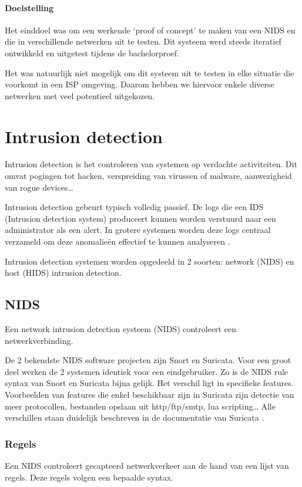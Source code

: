 \documentclass[a4paper, 12pt]{report}
\begin{document}
\subsubsection{Doelstelling}
Het einddoel was om een werkende `proof of concept' te maken van een NIDS en die in verschillende netwerken uit te testen.
Dit systeem werd steeds iteratief ontwikkeld en uitgetest tijdens de bachelorproef.

Het was natuurlijk niet mogelijk om dit systeem uit te testen in elke situatie die voorkomt in een ISP omgeving.
Daarom hebben we hiervoor enkele diverse netwerken met veel potentieel uitgekozen.

\chapter{Intrusion detection}
Intrusion detection is het controleren van systemen op verdachte activiteiten.
Dit omvat pogingen tot hacken, verspreiding van virussen of malware, aanwezigheid van rogue devices\dots

Intrusion detection gebeurt typisch volledig passief.
De logs die een IDS (Intrusion detection system) produceert kunnen worden verstuurd naar een administrator als een alert.
In grotere systemen worden deze logs centraal verzameld om deze anomalieën effectief te kunnen analyseren \autocite{wikipedia:ids}.

Intrusion detection systemen worden opgedeeld in 2 soorten: network (NIDS) en host (HIDS) intrusion detection.

\section{NIDS}
Een network intrusion detection systeem (NIDS) controleert een netwerkverbinding.

De 2 bekendste NIDS software projecten zijn Snort en Suricata.
Voor een groot deel werken de 2 systemen identiek voor een eindgebruiker.
Zo is de NIDS rule syntax van Snort en Suricata bijna gelijk.
Het verschil ligt in specifieke features.
Voorbeelden van features die enkel beschikbaar zijn in Suricata zijn detectie van meer protocollen, bestanden opslaan uit http/ftp/smtp, lua scripting\dots
Alle verschillen staan duidelijk beschreven in de documentatie van Suricata \autocite{suricata:docs}.

\subsection{Regels}
Een NIDS controleert gecapteerd netwerkverkeer aan de hand van een lijst van regels.
Deze regels volgen een bepaalde syntax.
\end{document}

